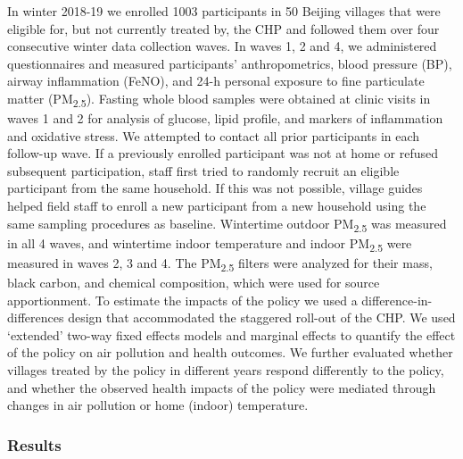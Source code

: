 \documentclass[
  letterpaper,
  DIV=11,
  numbers=noendperiod]{scrartcl}
\begin{document}
In winter 2018-19 we enrolled 1003 participants in 50 Beijing villages
that were eligible for, but not currently treated by, the CHP and
followed them over four consecutive winter data collection waves. In
waves 1, 2 and 4, we administered questionnaires and measured
participants' anthropometrics, blood pressure (BP), airway inflammation
(FeNO), and 24-h personal exposure to fine particulate matter
(PM\textsubscript{2.5}). Fasting whole blood samples were obtained at
clinic visits in waves 1 and 2 for analysis of glucose, lipid profile,
and markers of inflammation and oxidative stress. We attempted to
contact all prior participants in each follow-up wave. If a previously
enrolled participant was not at home or refused subsequent
participation, staff first tried to randomly recruit an eligible
participant from the same household. If this was not possible, village
guides helped field staff to enroll a new participant from a new
household using the same sampling procedures as baseline. Wintertime
outdoor PM\textsubscript{2.5} was measured in all 4 waves, and
wintertime indoor temperature and indoor PM\textsubscript{2.5} were
measured in waves 2, 3 and 4. The PM\textsubscript{2.5} filters were
analyzed for their mass, black carbon, and chemical composition, which
were used for source apportionment. To estimate the impacts of the
policy we used a difference-in-differences design that accommodated the
staggered roll-out of the CHP. We used `extended' two-way fixed effects
models and marginal effects to quantify the effect of the policy on air
pollution and health outcomes. We further evaluated whether villages
treated by the policy in different years respond differently to the
policy, and whether the observed health impacts of the policy were
mediated through changes in air pollution or home (indoor) temperature.

\subsubsection*{Results}\label{results}
\end{document}
